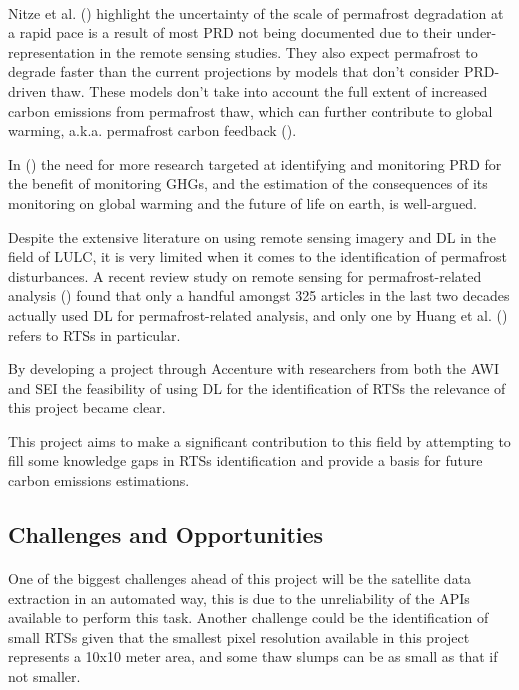 \paragraph{}
Nitze et al. (\cite{articleing2018}) highlight the uncertainty of the scale of permafrost degradation at a rapid pace is a result of most \gls{PRD} not being documented due to their under-representation in the remote sensing studies. 
They also expect permafrost to degrade faster than the current projections by models that don't consider \gls{PRD}-driven thaw. These models don't take into account the full extent of increased carbon emissions from permafrost thaw, which can further contribute to global warming, \gls{a.k.a.} permafrost carbon feedback (\cite{articlecarbonfeedback}).

In (\cite{book1}) the need for more research targeted at identifying and monitoring \gls{PRD} for the benefit of monitoring \gls{GHGs}, and the estimation of the consequences of its monitoring on global warming and the future of life on earth, is well-argued.

Despite the extensive literature on using remote sensing imagery and \gls{DL} in the field of \gls{LULC}, it is very limited when it comes to the identification of permafrost disturbances.
A recent review study on remote sensing for permafrost-related analysis (\cite{rs13061217}) found that only a handful amongst 325 articles in the last two decades actually used \gls{DL} for permafrost-related analysis, and only one by Huang et al. (\cite{HUANG2020111534}) refers to \gls{RTS}s in particular. 

By developing a project through Accenture with researchers from both the \gls{AWI} and \gls{SEI} the feasibility of using DL for the identification of \gls{RTS}s the relevance of this project became clear.

This project aims to make a significant contribution to this field by attempting to fill some knowledge gaps in \gls{RTS}s identification and provide a basis for future carbon emissions estimations.

\subsection{Challenges and Opportunities} \label{challenges}
\paragraph{}
One of the biggest challenges ahead of this project will be the satellite data extraction in an automated way, this is due to the unreliability of the \gls{API}s available to perform this task. Another challenge could be the identification of small \gls{RTS}s given that the smallest pixel resolution available in this project represents a 10x10 meter area, and some thaw slumps can be as small as that if not smaller.

